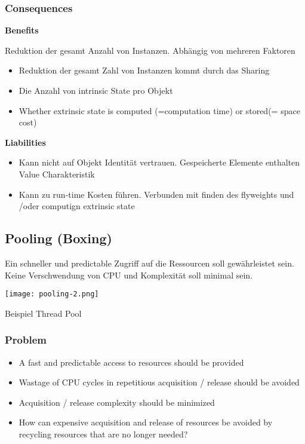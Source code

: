\subsubsection{Consequences}
\textbf{Benefits}

Reduktion der gesamt Anzahl von Instanzen. Abhängig von mehreren Faktoren

\begin{itemize}
    \item Reduktion der gesamt Zahl von Instanzen kommt durch das Sharing
    \item Die Anzahl von intrinsic State pro Objekt
    \item Whether extrinsic state is computed (=computation time) or stored(= space cost)
\end{itemize}
\vspace{10pt}
\textbf{Liabilities}
\begin{itemize}
    \item Kann nicht auf Objekt Identität vertrauen. Gespeicherte Elemente enthalten Value Charakteristik
    \item Kann zu run-time Kosten führen. Verbunden mit finden des flyweights und /oder computign extrinsic state
\end{itemize}

\subsection{Pooling (Boxing)}

Ein schneller und predictable Zugriff auf die Ressourcen soll gewährleistet sein. Keine Verschwendung von CPU und Komplexität soll minimal sein.

\texttt{[image: pooling-2.png]}

Beispiel Thread Pool

\subsubsection{Problem}
\begin{itemize}
    \item A fast and predictable access to resources should be provided
    \item Wastage of CPU cycles in repetitious acquisition / release should be avoided
    \item Acquisition / release complexity should be minimized
    \item How can expensive acquisition and release of resources be avoided by recycling resources that are no longer needed?
\end{itemize}
